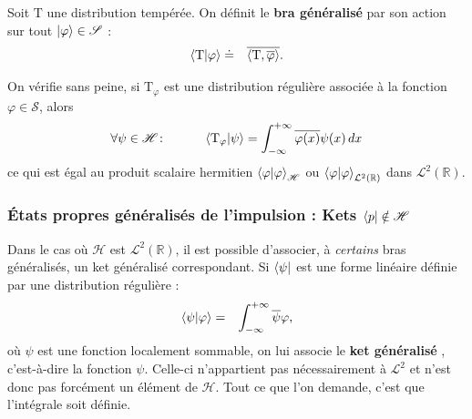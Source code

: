 \begin{Defi} Soit $\mathrm T$ une distribution tempérée. On définit le {\bf bra généralisé}  par son action sur tout $\ket{\varphi} \in \mathscr S$ :
    \begin{eqnarray}
        \braket{\mathrm T \vert \varphi} & \doteq & \overline{\braket{\mathrm T , \overline{ \varphi}}}.
    \end{eqnarray}
\end{Defi}
\begin{Rema} On vérifie sans peine, si $\mathrm T_\varphi$ est une distribution régulière associée à la fonction $\varphi \in \mathscr S$, alors
    \begin{eqnarray}
        \forall \psi \in \mathscr H \colon \qquad && \braket{\mathrm T _\varphi \vert \psi } = \int_{-\infty}^{+\infty} \overline{\varphi(x)} \psi(x) \, dx 
    \end{eqnarray} 
    ce qui est égal au produit scalaire hermitien $\braket{\mathrm \varphi \vert \varphi}_{\mathscr H}$ ou $\braket{\mathrm \varphi \vert \varphi}_{\mathcal L^2(\mathbb R)}$ dans $\mathcal L^2(\mathbb R)$.
\end{Rema}

\subsubsection{États propres généralisés de l’impulsion : Kets $\bra{p} \notin \mathscr H$ }

Dans le cas où $\mathscr H$ est $\mathcal L^2(\mathbb R)$, il est possible d'associer, à {\em certains} bras généralisés, un ket généralisé correspondant. Si $\bra{\psi}$ est une forme linéaire définie par une distribution régulière : 
\begin{eqnarray}
    \braket{\psi \vert \varphi} & = & \int_{-\infty}^{+\infty} \overline{\psi} \varphi , 
\end{eqnarray} 
où $\psi$ est une fonction localement sommable, on lui associe le {\bf ket généralisé \bm{$\ket{\psi}$}}, c'est-à-dire la fonction $\psi$. Celle-ci n'appartient pas nécessairement à $\mathcal L^2$ et n'est donc pas forcément un élément de $\mathscr H$. Tout ce que l'on demande, c'est que l'intégrale soit définie.

